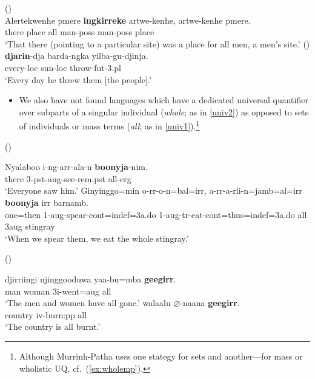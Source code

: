 \documentclass{article}
\begin{document}
\begin{exe}
   (\citealt[132]{wilkins89})\\
  \gll Alertekwenhe pmere \textbf{ingkirreke} artwe-kenhe, artwe-kenhe pmere.\\
  there place all man-{\sc poss} man-{\sc poss} place\\
  \glt `That there (pointing to a particular site) was a place for all men, a men's site.'
   (\citealt[48]{sands89}) \\
  \gll \textbf{djarin}-dja barda-ngka yilba-gu-djinja.\\
  every-{\sc loc} sun-{\sc loc}   throw-{\sc fut}-3.{\sc pl}\\
  \glt    `Every day he threw them [the people].'
\end{exe}

\begin{itemize}
\item We also have not found languages which have a dedicated universal quantifier over subparts of a singular individual (\textit{whole}; as in \ref{univ2}) as opposed to sets of individuals or mass terms (\textit{all}; as in \ref{univ1}).\footnote{Although Murrinh-Patha uses one stategy for sets and another---for mass or wholistic UQ, cf.\ (\ref{ex:wholemp}).}
\end{itemize}
\begin{exe}
   (\citealt[272]{bowern12})
  \begin{xlist}
    \ex\label{univ1} \gll Nyalaboo i-ng-arr-ala-n \textbf{boonyja}-nim.\\
    there 3-{\sc pst}-{\sc aug}-see-{\sc rem.pst} all-{\sc erg}\\
    \glt `Everyone saw him.'
    \ex\label{univ2} \gll Ginyinggo=min o-rr-o-n=bal=irr, a-rr-a-rli-n=jamb=al=irr \textbf{boonyja} irr barnamb.\\
    one={\sc then} 1-{\sc aug}-spear-{\sc cont}={\sc indef}=3{\sc a.do} 1-{\sc aug}-{\sc tr}-eat-{\sc cont}={\sc thus}={\sc indef}=3{\sc a.do} all 3{\sc aug} stingray\\
    \glt `When we spear them, we eat the whole stingray.'
  \end{xlist}
   (\citealt[307]{harvey92})
  \begin{xlist}
    \ex \gll djirriingi njinggooduwa yaa-bu=mba \textbf{geegirr}.\\
    man woman 3{\sc i}-went={\sc aug} all\\
    \glt `The men and women have all gone.'
    \ex \gll walaalu $\varnothing$-naana \textbf{geegirr}.\\
    country {\sc iv}-burn:{\sc pp} all\\
    \glt `The country is all burnt.'
  \end{xlist}
\end{exe}
\end{document}
